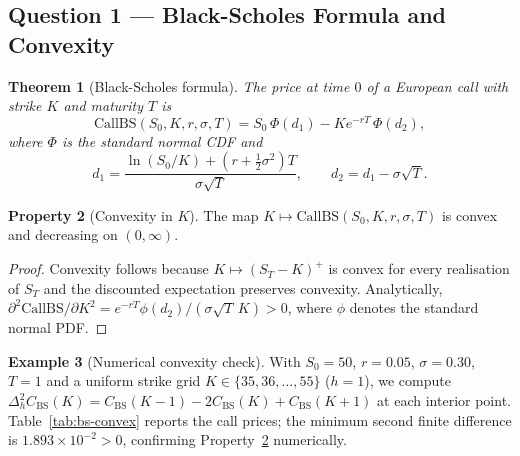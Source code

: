\documentclass[11pt,a4paper]{article}
\theoremstyle{plain}
\newtheorem{theorem}{Theorem}[section]
\theoremstyle{definition}
\newtheorem{example}[theorem]{Example}
\newtheorem{property}[theorem]{Property}
\begin{document}
\subsection{Question 1 --- Black-Scholes Formula and Convexity}
\label{subsec:q1}

\begin{theorem}[Black-Scholes formula]
\label{thm:bs}
The price at time $0$ of a European call with strike $K$ and maturity $T$ is
\begin{equation}
  \mathrm{CallBS}(S_0,K,r,\sigma,T)
  = S_0\,\Phi(d_1) - K e^{-rT}\,\Phi(d_2),
\end{equation}
where $\Phi$ is the standard normal CDF and
\begin{equation}
  d_1 = \frac{\ln(S_0/K)+(r+\frac{1}{2}\sigma^2)T}{\sigma\sqrt{T}},
  \qquad d_2 = d_1 - \sigma\sqrt{T}.
\end{equation}
\end{theorem}

\begin{property}[Convexity in $K$]
\label{prop:convex}
The map $K \mapsto \mathrm{CallBS}(S_0,K,r,\sigma,T)$ is convex and
decreasing on $(0,\infty)$.
\end{property}

\begin{proof}
Convexity follows because $K \mapsto (S_T - K)^+$ is convex for every
realisation of $S_T$ and the discounted expectation preserves convexity.
Analytically, $\partial^2\mathrm{CallBS}/\partial K^2
= e^{-rT}\phi(d_2)/(\sigma\sqrt{T}\,K) > 0$,
where $\phi$ denotes the standard normal PDF.
\end{proof}

\begin{example}[Numerical convexity check]
With $S_0=50$, $r=0.05$, $\sigma=0.30$, $T=1$ and a uniform strike grid
$K\in\{35,36,\ldots,55\}$ ($h=1$), we compute
$\Delta^2_h C_{\mathrm{BS}}(K) = C_{\mathrm{BS}}(K-1)-2C_{\mathrm{BS}}(K)+C_{\mathrm{BS}}(K+1)$
at each interior point.
Table~\ref{tab:bs-convex} reports the call prices; the minimum second
finite difference is $1.893\times10^{-2}>0$, confirming
Property~\ref{prop:convex} numerically.
\end{example}
\end{document}
